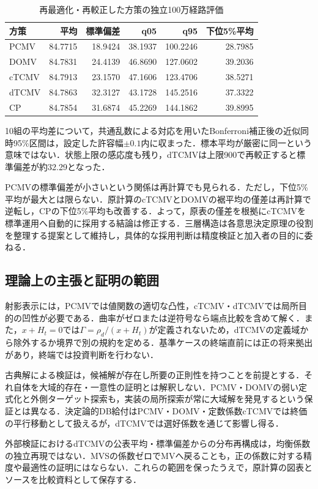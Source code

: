 \documentclass[10pt,a4paper]{article}
\theoremstyle{plain}
\theoremstyle{definition}
\begin{document}
\begin{table}[htbp]\centering\small
\caption{再最適化・再較正した方策の独立100万経路評価}\label{tab:corrected-v8}
\begin{tabular}{lrrrrr}\toprule
方策 & 平均 & 標準偏差 & q05 & q95 & 下位5\%平均\\\midrule
PCMV &84.7715&18.9424&38.1937&100.2246&28.7985\\
DOMV &84.7831&24.4139&46.8690&127.0602&39.2036\\
cTCMV&84.7913&23.1570&47.1606&123.4706&38.5271\\
dTCMV&84.7863&32.3127&43.1728&145.2516&37.3322\\
CP&84.7854&31.6874&45.2269&144.1862&39.8995\\\bottomrule
\end{tabular}\end{table}
10組の平均差について，共通乱数による対応を用いたBonferroni補正後の近似同時95\%区間は，設定した許容幅$\pm0.1$内に収まった．標本平均が厳密に同一という意味ではない．状態上限の感応度も残り，dTCMVは上限900で再較正すると標準偏差が約32.29となった．

PCMVの標準偏差が小さいという関係は再計算でも見られる．ただし，下位5\%平均が最大とは限らない．原計算のcTCMVとDOMVの裾平均の僅差は再計算で逆転し，CPの下位5\%平均も改善する．よって，原表の僅差を根拠にcTCMVを標準運用へ自動的に採用する結論は修正する．三層構造は各意思決定原理の役割を整理する提案として維持し，具体的な採用判断は精度検証と加入者の目的に委ねる．

\subsection{理論上の主張と証明の範囲}
射影表示には，PCMVでは値関数の適切な凸性，cTCMV・dTCMVでは局所目的の凹性が必要である．曲率がゼロまたは逆符号なら端点比較を含めて解く．また，$x+H_t=0$では$\Gamma=\rho_d/(x+H_t)$が定義されないため，dTCMVの定義域から除外するか境界で別の規約を定める．基準ケースの終端直前には正の将来拠出があり，終端では投資判断を行わない．

古典解による検証は，候補解が存在し所要の正則性を持つことを前提とする．それ自体を大域的存在・一意性の証明とは解釈しない．PCMV・DOMVの弱い定式化と外側ターゲット探索も，実装の局所探索が常に大域解を発見するという保証とは異なる．決定論的DB給付はPCMV・DOMV・定数係数cTCMVでは終価の平行移動として扱えるが，dTCMVでは選好係数を通じて影響し得る．

外部検証におけるdTCMVの公表平均・標準偏差からの分布再構成は，均衡係数の独立再現ではない．MVSの係数ゼロでMVへ戻ることも，正の係数に対する精度や最適性の証明にはならない．これらの範囲を保ったうえで，原計算の図表とソースを比較資料として保存する．
\end{document}
